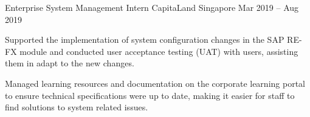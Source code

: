 \begin{cventries}
  \cventry
  {Enterprise System Management Intern} %
  {CapitaLand} %
  {Singapore} %
  {Mar 2019 – Aug 2019} %
  {
    \begin{cvitems} %
      \item {Supported the implementation of system configuration changes in the SAP RE-FX module and conducted user acceptance testing (UAT) with users, assisting them in adapt to the new changes.}
      \item {Managed learning resources and documentation on the corporate learning portal to ensure technical specifications were up to date, making it easier for staff to find solutions to system related issues.} \vspace{5mm}
    \end{cvitems}
  }

\end{cventries}
